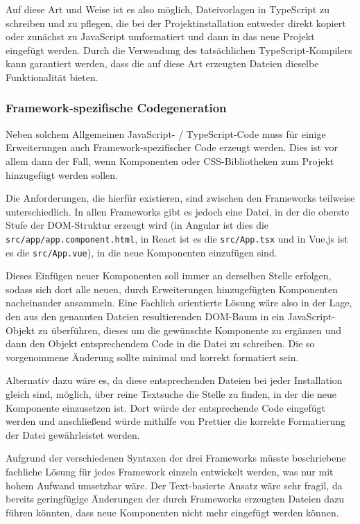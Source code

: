 Auf diese Art und Weise ist es also möglich, Dateivorlagen in TypeScript zu schreiben und zu pflegen, die bei der Projektinstallation entweder direkt kopiert oder zunächst zu JavaScript umformatiert und dann in das neue Projekt eingefügt werden. Durch die Verwendung des tatsächlichen TypeScript-Kompilers kann garantiert werden, dass die auf diese Art erzeugten Dateien dieselbe Funktionalität bieten.

\subsubsection{Framework-spezifische Codegeneration}
Neben solchem Allgemeinen JavaScript- / TypeScript-Code muss für einige Erweiterungen auch Framework-spezifischer Code erzeugt werden. Dies ist vor allem dann der Fall, wenn Komponenten oder CSS-Bibliotheken zum Projekt hinzugefügt werden sollen.

Die Anforderungen, die hierfür existieren, sind zwischen den Frameworks teilweise unterschiedlich. In allen Frameworks gibt es jedoch eine Datei, in der die oberste Stufe der \gls{DOM}-Struktur erzeugt wird (in Angular ist dies die \verb|src/app/app.component.html|, in React ist es die \verb|src/App.tsx| und in Vue.js ist es die \verb|src/App.vue|), in die neue Komponenten einzufügen sind.

Dieses Einfügen neuer Komponenten soll immer an derselben Stelle erfolgen, sodass sich dort alle neuen, durch Erweiterungen hinzugefügten Komponenten nacheinander ansammeln. Eine Fachlich orientierte Lösung wäre also in der Lage, den aus den genannten Dateien resultierenden \gls{DOM}-Baum in ein JavaScript-Objekt zu überführen, dieses um die gewünschte Komponente zu ergänzen und dann den Objekt entsprechendem Code in die Datei zu schreiben. Die so vorgenommene Änderung sollte minimal und korrekt formatiert sein.

Alternativ dazu wäre es, da diese entsprechenden Dateien bei jeder Installation gleich sind, möglich, über reine Textsuche die Stelle zu finden, in der die neue Komponente einzusetzen ist. Dort würde der entsprechende Code eingefügt werden und anschließend würde mithilfe von Prettier die korrekte Formatierung der Datei gewährleistet werden.

Aufgrund der verschiedenen Syntaxen der drei Frameworks müsste beschriebene fachliche Lösung für jedes Framework einzeln entwickelt werden, was nur mit hohem Aufwand umsetzbar wäre. Der Text-basierte Ansatz wäre sehr fragil, da bereits geringfügige Änderungen der durch Frameworks erzeugten Dateien dazu führen könnten, dass neue Komponenten nicht mehr eingefügt werden können.

